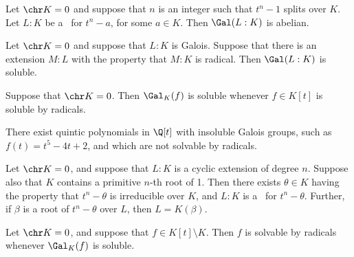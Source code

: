 \documentclass[a4paper]{article}
\begin{document}
\begin{tlemma}
  Let \( \chr K = 0 \) and suppose that \( n \) is an integer such that \( t^n-1 \) splits over \( K \).
  Let \( L:K \) be a \sfe~for \( t^n-a \), for some \( a\in K \).
  Then \( \Gal(L:K) \) is abelian.
\end{tlemma}

\begin{ttheorem}
  Let \( \chr K = 0 \) and suppose that \( L:K \) is Galois.
  Suppose that there is an extension \( M:L \) with the property that \( M:K \) is radical.
  Then \( \Gal(L:K) \) is soluble.
\end{ttheorem}

\begin{tcorollary}
  Suppose that \( \chr K = 0 \).
  Then \( \Gal_K(f) \) is soluble whenever \( f\in K[t] \) is soluble by radicals.
\end{tcorollary}

\begin{tcorollary}
  There exist quintic polynomials in \( \Q[t] \) with insoluble Galois groups, such as \( f(t) = t^5-4t+2 \), and which are not solvable by radicals.
\end{tcorollary}

\begin{tlemma}
  Let \( \chr K = 0 \), and suppose that \( L:K \) is a cyclic extension of degree \( n \).
  Suppose also that \( K \) contains a primitive \( n \)-th root of 1.
  Then there exists \( \theta \in K \) having the property that \( t^n -\theta \) is irreducible over \( K \), and \( L:K \) is a \sf~for \( t^n-\theta \).
  Further, if \( \beta \) is a root of \( t^n-\theta \) over \( L \), then \( L=K(\beta) \).
\end{tlemma}

\begin{ttheorem}
  Let \( \chr K = 0 \), and suppose that \( f\in K[t]\setminus K \).
  Then \( f \) is solvable by radicals whenever \( \Gal_K(f) \) is soluble.
\end{ttheorem}
\end{document}
